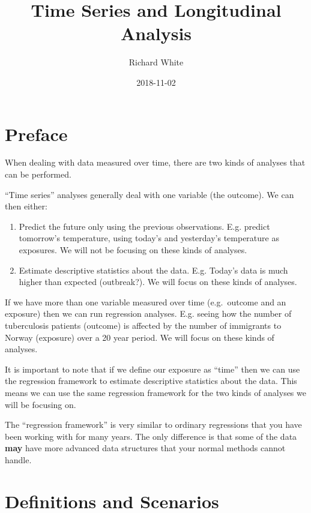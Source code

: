 \documentclass[]{book}
\title{Time Series and Longitudinal Analysis}
\author{Richard White}
\date{2018-11-02}
\providecommand{\tightlist}{%
  \setlength{\itemsep}{0pt}\setlength{\parskip}{0pt}}
\begin{document}
\maketitle

{
\setcounter{tocdepth}{1}
\tableofcontents
}
\chapter*{Preface}\label{preface}

When dealing with data measured over time, there are two kinds of
analyses that can be performed.

``Time series'' analyses generally deal with one variable (the outcome).
We can then either:

\begin{enumerate}
\def\labelenumi{\arabic{enumi}.}
\tightlist
\item
  Predict the future only using the previous observations. E.g. predict
  tomorrow's temperature, using today's and yesterday's temperature as
  exposures. We will not be focusing on these kinds of analyses.
\item
  Estimate descriptive statistics about the data. E.g. Today's data is
  much higher than expected (outbreak?). We will focus on these kinds of
  analyses.
\end{enumerate}

If we have more than one variable measured over time (e.g.~outcome and
an exposure) then we can run regression analyses. E.g. seeing how the
number of tuberculosis patients (outcome) is affected by the number of
immigrants to Norway (exposure) over a 20 year period. We will focus on
these kinds of analyses.

It is important to note that if we define our exposure as ``time'' then
we can use the regression framework to estimate descriptive statistics
about the data. This means we can use the same regression framework for
the two kinds of analyses we will be focusing on.

The ``regression framework'' is very similar to ordinary regressions
that you have been working with for many years. The only difference is
that some of the data \textbf{may} have more advanced data structures
that your normal methods cannot handle.

\chapter{Definitions and Scenarios}\label{definitions-and-scenarios}
\end{document}
